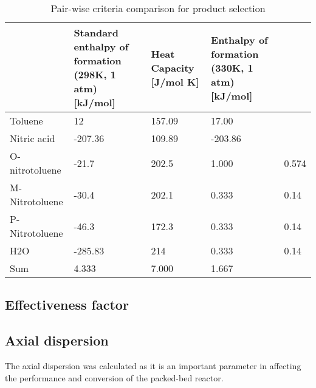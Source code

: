 \begin{table}[H]
\centering
\caption{Pair-wise criteria comparison for product selection}
\label{tab:pairwise}
\begin{tabularx}{\linewidth}{l|XXX}
\toprule
                                                                & Standard enthalpy of formation (298K, 1 atm) [kJ/mol] & Heat Capacity [J/mol K] & Enthalpy of formation (330K, 1 atm) [kJ/mol] \\ \midrule
Toluene                        & 12              & 157.09              & 17.00                     \\
Nitric acid                      & -207.36              & 109.89              & -203.86                       \\
O-nitrotoluene & -21.7             & 202.5              & 1.000                    & 0.574   \\ 
M-Nitrotoluene                      & -30.4              & 202.1             & 0.333                    & 0.14    \\
P-Nitrotoluene                      & -46.3              & 172.3             & 0.333                    & 0.14    \\
H2O                      & -285.83              & 214              & 0.333                    & 0.14    \\\midrule
Sum                                      & 4.333              & 7.000              & 1.667                    &                              \\ \bottomrule
\end{tabularx}
\end{table}
\subsection{Effectiveness factor}

\subsection{Axial dispersion}
The axial dispersion was calculated as it is an important parameter in affecting the performance and conversion of the packed-bed reactor. 

